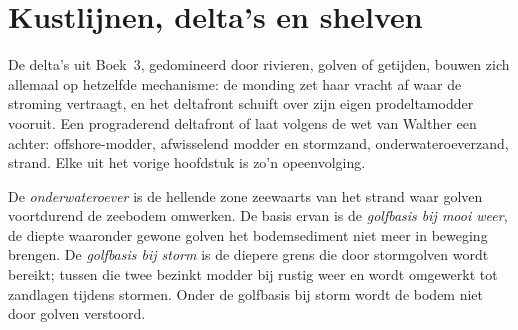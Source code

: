 \begin{omfigure}
\par{}\label{fig:b3:facies-models:rivers}
\end{omfigure}

\section{Kustlijnen, delta's en shelven}\label{sec:b3:facies-models:shelves}

De delta's uit Boek~3, gedomineerd door rivieren, golven of getijden, bouwen zich allemaal
op hetzelfde mechanisme: de monding zet haar vracht af waar de
stroming vertraagt, en het deltafront schuift over zijn eigen prodeltamodder vooruit. Een
prograderend deltafront of  laat volgens de wet van Walther een
 achter: offshore-modder, afwisselend modder en stormzand,
onderwateroeverzand, strand. Elke  uit het vorige hoofdstuk is zo'n
opeenvolging.

\begin{definition}\label{def:b3:facies-models:shoreface}
De \emph{onderwateroever} is de hellende zone zeewaarts van het
strand waar golven voortdurend de zeebodem omwerken. De basis ervan is de
\emph{golfbasis bij mooi weer}, de diepte waaronder
gewone golven het bodemsediment niet meer in beweging brengen. De \emph{golfbasis bij storm}
is de diepere grens die door stormgolven wordt bereikt;
tussen die twee bezinkt modder bij rustig weer en wordt omgewerkt tot zandlagen
tijdens stormen. Onder de golfbasis bij storm wordt de bodem niet door golven verstoord.
\end{definition}

